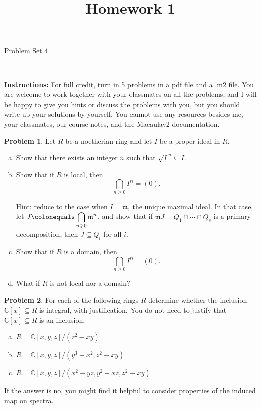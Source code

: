 \documentclass[11pt]{article}
\title{}
\date{\vspace{-0.5in}}
\title{Homework 1}
\newcommand{\m}{\mathfrak{m}}
\newcommand{\C}{\mathbb{C}}
\theoremstyle{definition}
\newtheorem{problem}{Problem}
\begin{document}
\thispagestyle{fancy}
\pagestyle{fancy}

\vspace{3em}

\begin{center}
	{\LARGE Problem Set 4}
\end{center}

\

\noindent
{\bf Instructions:}
For full credit, turn in 5 problems in a pdf file and a .m2 file. 
You are welcome to work together with your classmates on all the problems, and I will be happy to give you hints or discuss the problems with you, but you should write up your solutions by yourself.
You cannot use any resources besides me, your classmates, our course notes, and the Macaulay2 documentation.


\vspace{2em}


\begin{problem}
	Let $R$ be a noetherian ring and let $I$ be a proper ideal in $R$.
	\begin{enumerate}[a)]
		\item Show that there exists an integer $n$ such that $\sqrt{I}^n \subseteq I$.
		\item Show that if $R$ is local, then
		$$\bigcap_{n \geqslant 0} I^n = (0).$$
		
		\noindent
		Hint: reduce to the case when $I = \m$, the unique maximal ideal. In that case, let $J \colonequals \displaystyle\bigcap_{n\geqslant 0} \m^n$, and show that if $\m J = Q_1 \cap \cdots \cap Q_s$ is a primary decomposition, then $J \subseteq Q_i$ for all $i$.
		
		\item Show that if $R$ is a domain, then
		$$\bigcap_{n \geqslant 0} I^n = (0).$$
		\item What if $R$ is not local nor a domain?
	\end{enumerate}
\end{problem}


\vfill

\begin{problem}
For each of the following rings $R$ determine whether the inclusion $\C[x] \subseteq R$ is integral, with justification. You do not need to justify that $\C[x] \subseteq R$ is an inclusion.
\begin{enumerate}[a)]
\item $R=\C[x,y,z]/(z^2-xy)$
\item $R=\C[x,y,z]/(y^3-x^2, z^2-xy)$
\item $R=\C[x,y,z]/(x^2-yz, y^2-xz, z^2-xy)$
\end{enumerate}
If the answer is no, you might find it helpful to consider properties of the induced map on spectra.
\end{problem}
\end{document}
